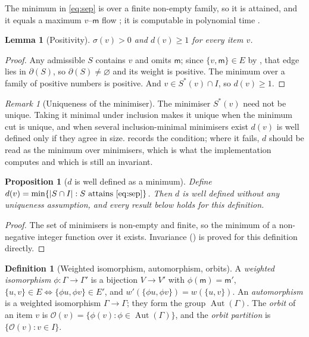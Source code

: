 \documentclass[11pt,twocolumn,a4paper]{article}
\theoremstyle{crthm}
\newtheorem{lemma}[theorem]{Lemma}
\newtheorem{proposition}[theorem]{Proposition}
\theoremstyle{definition}
\newtheorem{definition}[theorem]{Definition}
\theoremstyle{remark}
\newtheorem{remark}[theorem]{Remark}
\newcommand{\Gph}{\Gamma}
\newcommand{\V}{V}
\newcommand{\E}{E}
\newcommand{\wt}{w}
\newcommand{\med}{\mathsf{m}}
\newcommand{\cut}{\partial}
\newcommand{\sep}{\sigma}
\newcommand{\dep}{d}
\newcommand{\abs}[1]{\lvert#1\rvert}
\newcommand{\Aut}{\operatorname{Aut}}
\newcommand{\orb}{\mathcal{O}}
\begin{document}
The minimum in \eqref{eq:sep} is over a finite non-empty family, so it is
attained, and it equals a maximum $v$--$\med$ flow
\citep{fordfulkerson1956}; it is computable in polynomial time
\citep{stoer1997,orlin2013}.

\begin{lemma}[Positivity]
\label{lem:positive}
$\sep(v)>0$ and $\dep(v)\ge1$ for every item $v$.
\end{lemma}

\begin{proof}
Any admissible $S$ contains $v$ and omits $\med$; since
$\{v,\med\}\in\E$ by , that edge lies in $\cut(S)$, so
$\cut(S)\neq\varnothing$ and its weight is positive. The minimum over a
family of positive numbers is positive. And $v\in S^{*}(v)\cap I$, so
$\dep(v)\ge1$.
\end{proof}

\begin{remark}[Uniqueness of the minimiser]
\label{rem:unique}
The minimiser $S^{*}(v)$ need not be unique. Taking it minimal under
inclusion makes it unique when the minimum cut is unique, and when several
inclusion-minimal minimisers exist $\dep(v)$ is well defined only if they
agree in size.  records the condition; where it
fails, $\dep$ should be read as the minimum over minimisers, which is what
the implementation computes and which is still an invariant.
\end{remark}

\begin{proposition}[$\dep$ is well defined as a minimum]
\label{prop:depth-welldef}
Define $\dep(v)=\min\{\abs{S\cap I} : S \text{ attains } \eqref{eq:sep}\}$.
Then $\dep$ is well defined without any uniqueness assumption, and every
result below holds for this definition.
\end{proposition}

\begin{proof}
The set of minimisers is non-empty and finite, so the minimum of a
non-negative integer function over it exists. Invariance
() is proved for this definition directly.
\end{proof}

\begin{definition}[Weighted isomorphism, automorphism, orbits]
\label{def:iso}
A \emph{weighted isomorphism} $\phi\colon\Gph\to\Gph'$ is a bijection
$\V\to\V'$ with $\phi(\med)=\med'$, $\{u,v\}\in\E \iff
\{\phi u,\phi v\}\in\E'$, and $\wt'(\{\phi u,\phi v\})=\wt(\{u,v\})$. An
\emph{automorphism} is a weighted isomorphism $\Gph\to\Gph$; they form the
group $\Aut(\Gph)$. The \emph{orbit} of an item $v$ is
$\orb(v)=\{\phi(v):\phi\in\Aut(\Gph)\}$, and the \emph{orbit partition} is
$\{\orb(v):v\in I\}$.
\end{definition}
\end{document}

